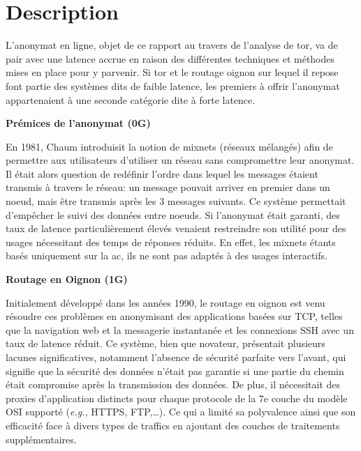 \section{Description}\label{sec:description}

L'anonymat en ligne, objet de ce rapport au travers de l'analyse de \acrshort{tor}, va de pair avec une latence accrue en raison des différentes techniques et méthodes mises en place pour y parvenir.
Si \acrshort{tor} et le routage oignon sur lequel il repose font partie des systèmes dits de faible latence, les premiers à offrir l'anonymat appartenaient à une seconde catégorie dite à forte latence.

\textbf{Prémices de l'anonymat (0G)}

En 1981, Chaum introduisit la notion de mixnets (réseaux mélangés) \cite{chaum_cmix_nodate} afin de permettre aux utilisateurs d'utiliser un réseau sans compromettre leur anonymat.
Il était alors question de redéfinir l'ordre dans lequel les messages étaient transmis à travers le réseau: un message pouvait arriver en premier dans un noeud, mais être transmis après les 3 messages suivants.
Ce système permettait d'empêcher le suivi des données entre noeuds.
Si l'anonymat était garanti, des taux de latence particulièrement élevés venaient restreindre son utilité pour des usages nécessitant des temps de réponses réduits.
En effet, les mixnets étants basés uniquement sur la \acrfull{ac}, ils ne sont pas adaptés à des usages interactifs.

\textbf{Routage en Oignon (1G)}

Initialement développé dans les années 1990, le routage en oignon est venu résoudre ces problèmes en anonymisant des applications basées sur TCP, telles que la navigation web et la messagerie instantanée et les connexions SSH avec un taux de latence réduit.
Ce système, bien que novateur, présentait plusieurs lacunes significatives, notamment l'absence de sécurité parfaite vers l'avant, qui signifie que la sécurité des données n'était pas garantie si une partie du chemin était compromise après la transmission des données. 
De plus, il nécessitait des proxies d'application distincts pour chaque protocole de la 7e couche du modèle OSI supporté (\textit{e.g.,} HTTPS, FTP,\dots).
Ce qui a limité sa polyvalence ainsi que son efficacité face à divers types de traffics en ajoutant des couches de traitements supplémentaires.



% 
% 

